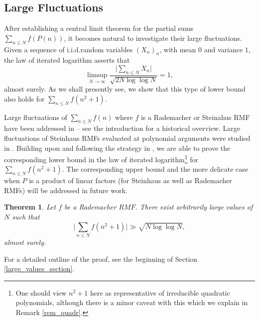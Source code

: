 \documentclass[11pts]{amsart}
\numberwithin{equation}{section}
\newtheorem{thm}{Theorem}[section]
\begin{document}
\subsection{Large Fluctuations} 

After establishing a central limit theorem for the partial sums $\sum_{n\leq N} f(P(n))$, it becomes natural to investigate their large fluctuations. Given a sequence of i.i.d.\;random variables $(X_n)_n$, with mean $0$ and variance $1$, the law of iterated logarithm asserts that
\[
\limsup_{N\to\infty} \frac{\lvert \sum_{n\leq N} X_n\rvert}{\sqrt{2N\log\log N}} = 1,
\]
almost surely. As we shall presently see, we show that this type of lower bound also holds for $\sum_{n\leq N} f(n^2 + 1)$. 

Large fluctuations of $\sum_{n\leq N} f(n)$ where $f$ is a Rademacher or Steinahus RMF have been addressed in \cite{Harper_Fluctuations} -- see the introduction for a historical overview. Large fluctuations of Steinhaus RMFs evaluated at polynomial arguments were studied in \cite{Oleksiy-RandomChowla}. Building upon \cite{Harper_Fluctuations} and following the strategy in \cite{Oleksiy-RandomChowla}, we are able to prove the corresponding lower bound in the law of iterated logarithm\footnote{One should view $n^2 + 1$ here as representative of irreducible quadratic polynomials, although there is a minor caveat with this which we explain in Remark \ref{rem_quadr}.} for $\sum_{n\leq N} f(n^2 + 1)$. The corresponding upper bound and the more delicate case when $P$ is a product of linear factors (for Steinhaus as well as Rademacher RMFs) will be addressed in future work. 

\begin{thm}
    \label{large_values_theorem} Let $f$ be a Rademacher $RMF$. There exist arbitrarily large values of $N$ such that
    \begin{equation}
        \Big|\sum_{n\leq N} f(n^2 + 1)\Big| \gg \sqrt{N\log\log N},
    \end{equation}
    almost surely.
\end{thm}

For a detailed outline of the proof, see the beginning of Section \ref{large_values_section}. 
\end{document}

